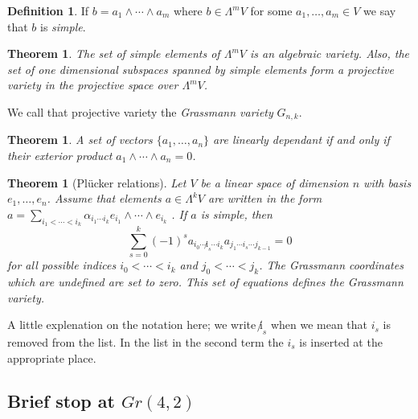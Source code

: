 \documentclass[a4paper,12pt]{book}
\theoremstyle{plain}
\newtheorem{thm}[equation]{Theorem}
\theoremstyle{definition}
\newtheorem{defi}[equation]{Definition}
\begin{document}
\begin{defi}
	If \( b = a_1 \wedge \cdots \wedge a_m \) where \( b \in \Lambda^m V \) for some
	\( a_1, \ldots, a_m \in V \) we say that \( b \) is \emph{simple}.
\end{defi}

\begin{thm}
	The set of simple elements of \( \Lambda^m V \) is an algebraic variety.
	Also, the set of one dimensional subspaces spanned by simple elements form a projective
	variety in the projective space over \( \Lambda^m V \).
\end{thm}
We call that projective variety the \emph{Grassmann variety} \( G_{n,k} \).
\begin{thm}
	A set of vectors \( \{a_1, \ldots, a_n\} \) are linearly dependant if and only if their exterior
	product \( a_1 \wedge \cdots \wedge a_n = 0 \).
\end{thm}
\begin{thm}[Pl{\"u}cker relations]
	Let \( V \) be a linear space of dimension \( n \) with basis \( e_1, \ldots, e_n \).
	Assume that elements \( a \in \Lambda^k V \) are written in the form
	\( a = \sum_{i_1 < \cdots < i_k} \alpha_{i_1 \cdots i_k} e_{i_1} \wedge \cdots \wedge e_{i_k} \)
	.
	If \( a \) is simple, then
	\[
		\sum_{s=0}^k (-1)^s a_{i_0 \cdots \not i_s \cdots i_k} a_{j_1 \cdots i_s \cdots j_{k-1}}
		= 0
	\]
	for all possible indices \( i_0 < \cdots < i_k \) and \( j_0 < \cdots < j_k \).
	The Grassmann coordinates which are undefined are set to zero.
	This set of equations defines the Grassmann variety.
\end{thm}
A little explenation on the notation here; we write \( \not i_s \) when we mean that \( i_s \)
is removed from the list. In the list in the second term the \( i_s \) is inserted at the
appropriate place.

\subsection{Brief stop at \( Gr(4,2) \)} %
\label{sub:brief_stop_at_inl}
\end{document}
